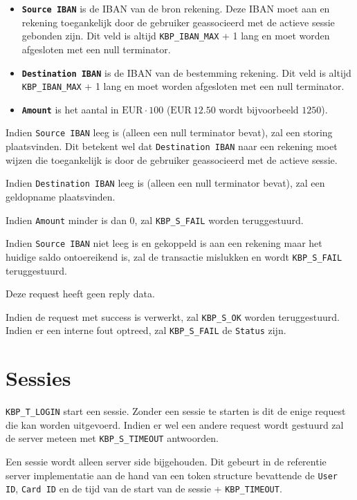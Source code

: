\documentclass[11pt,a4paper]{article}
\begin{document}
\begin{itemize}
	\item \textbf{\texttt{Source IBAN}} is de IBAN van de bron rekening.
		Deze IBAN moet aan en rekening toegankelijk door de gebruiker
		geassocieerd met de actieve sessie gebonden zijn. Dit veld is
		altijd \texttt{KBP\_IBAN\_MAX} + 1 lang en moet worden
		afgesloten met een null terminator.
	\item \textbf{\texttt{Destination IBAN}} is de IBAN van de bestemming
		rekening. Dit veld is altijd \texttt{KBP\_IBAN\_MAX} + 1 lang en
		moet worden afgesloten met een null terminator.
	\item \textbf{\texttt{Amount}} is het aantal in $\text{EUR} \cdot 100$
		($\text{EUR}\ 12.50$ wordt bijvoorbeeld $1250$).
\end{itemize}

Indien \texttt{Source IBAN} leeg is (alleen een null terminator bevat), zal een
storing plaatsvinden. Dit betekent wel dat \texttt{Destination IBAN} naar een
rekening moet wijzen die toegankelijk is door de gebruiker geassocieerd met de
actieve sessie.

Indien \texttt{Destination IBAN} leeg is (alleen een null terminator bevat), zal
een geldopname plaatsvinden.

Indien \texttt{Amount} minder is dan 0, zal \texttt{KBP\_S\_FAIL} worden
teruggestuurd.

Indien \texttt{Source IBAN} niet leeg is en gekoppeld is aan een rekening maar
het huidige saldo ontoereikend is, zal de transactie mislukken en wordt
\texttt{KBP\_S\_FAIL} teruggestuurd.

Deze request heeft geen reply data.

Indien de request met success is verwerkt, zal \texttt{KBP\_S\_OK} worden
teruggestuurd. Indien er een interne fout optreed, zal \texttt{KBP\_S\_FAIL} de
\texttt{Status} zijn.


\label{sec:sessies}
\section{Sessies}
\texttt{KBP\_T\_LOGIN} start een sessie. Zonder een sessie te starten is dit de
enige request die kan worden uitgevoerd. Indien er wel een andere request wordt
gestuurd zal de server meteen met \texttt{KBP\_S\_TIMEOUT} antwoorden.

Een sessie wordt alleen server side bijgehouden. Dit gebeurt in de referentie
server implementatie aan de hand van een token structure bevattende de
\texttt{User ID}, \texttt{Card ID} en de tijd van de start van de sessie +
\texttt{KBP\_TIMEOUT}.
\end{document}

